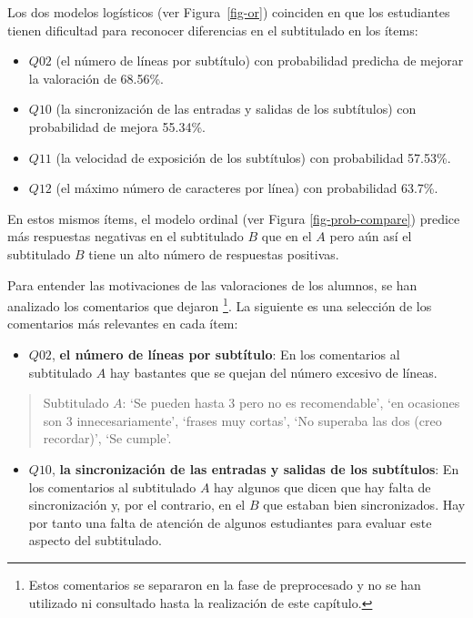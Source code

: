 \documentclass[
  12pt,
  a4paper,
  extrafontsizes,
  onecolumn,
  openright,
  table]{memoir}
\providecommand{\tightlist}{%
  \setlength{\itemsep}{0pt}\setlength{\parskip}{0pt}}\usepackage{longtable,booktabs,array}
\begin{document}
Los dos modelos logísticos (ver Figura~\ref{fig-or}) coinciden en que
los estudiantes tienen dificultad para reconocer diferencias en el
subtitulado en los ítems:

\begin{itemize}
\tightlist
\item
  \(Q02\) (el número de líneas por subtítulo) con probabilidad predicha
  de mejorar la valoración de 68.56\%.
\item
  \(Q10\) (la sincronización de las entradas y salidas de los
  subtítulos) con probabilidad de mejora 55.34\%.
\item
  \(Q11\) (la velocidad de exposición de los subtítulos) con
  probabilidad 57.53\%.
\item
  \(Q12\) (el máximo número de caracteres por línea) con probabilidad
  63.7\%.
\end{itemize}

En estos mismos ítems, el modelo ordinal (ver Figura
\ref{fig-prob-compare}) predice más respuestas negativas en el
subtitulado \(B\) que en el \(A\) pero aún así el subtitulado \(B\)
tiene un alto número de respuestas positivas.

Para entender las motivaciones de las valoraciones de los alumnos, se
han analizado los comentarios que dejaron \footnote{Estos comentarios se
  separaron en la fase de preprocesado y no se han utilizado ni
  consultado hasta la realización de este capítulo.}. La siguiente es
una selección de los comentarios más relevantes en cada ítem:

\begin{itemize}
\tightlist
\item
  \(Q02\), \textbf{el número de líneas por subtítulo}: En los
  comentarios al subtitulado \(A\) hay bastantes que se quejan del
  número excesivo de líneas.
\end{itemize}

\small

\begin{quote}
Subtitulado \(A\): \enquote*{Se pueden hasta 3 pero no es recomendable},
\enquote*{en ocasiones son 3 innecesariamente}, \enquote*{frases muy
cortas}, \enquote*{No superaba las dos (creo recordar)}, \enquote*{Se
cumple}.
\end{quote}

\normalsize

\begin{itemize}
\tightlist
\item
  \(Q10\), \textbf{la sincronización de las entradas y salidas de los
  subtítulos}: En los comentarios al subtitulado \(A\) hay algunos que
  dicen que hay falta de sincronización y, por el contrario, en el \(B\)
  que estaban bien sincronizados. Hay por tanto una falta de atención de
  algunos estudiantes para evaluar este aspecto del subtitulado.
\end{itemize}
\end{document}
